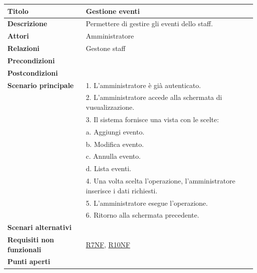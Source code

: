 \documentclass[a4paper]{article}
\begin{document}
\begin{center}
\begin{tabularx}{1\textwidth}{|l|X|}
    \hline
	\textbf{Titolo} & Gestione eventi \\
	\hline
	\textbf{Descrizione} & Permettere di gestire gli eventi dello staff. \\
	\hline
	\textbf{Attori} & Amministratore \\
	\hline
	\textbf{Relazioni} & Gestone staff \\
	\hline
	\textbf{Precondizioni} &  \\
	\hline
	\textbf{Postcondizioni} &  \\
	\hline
	\textbf{Scenario principale} & 1. L'amministratore è già autenticato.\\
	                             & 2. L'amministratore accede alla schermata di vusualizzazione. \\
								 & 3. Il sistema fornisce una vista con le scelte: \\
								 & \quad a. Aggiungi evento.\\
								 & \quad b. Modifica evento.\\
								 & \quad c. Annulla evento.\\
								 & \quad d. Lista eventi.\\
								 & 4. Una volta scelta l'operazione, l'amministratore inserisce i dati richiesti. \\
								 & 5. L'amministratore esegue l'operazione.\\
								 & 6. Ritorno alla schermata precedente.\\
	\hline
	\textbf{Scenari alternativi} & \\
	\hline
	\textbf{Requisiti non funzionali} & \hyperlink{R7NF}{R7NF}, \hyperlink{R10NF}{R10NF} \\
	\hline
	\textbf{Punti aperti} & \\
	\hline
\end{tabularx}
\end{center}

\end{document}

